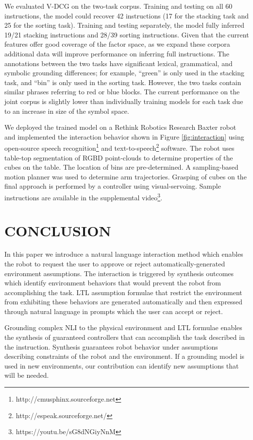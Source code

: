 \documentclass[letterpaper]{article} %
\begin{document}
We evaluated V-DCG on the two-task corpus. Training and testing on all 60 instructions, the model could recover 42 instructions (17 for the stacking task and 25 for the sorting task). Training and testing separately, the model fully inferred 19/21 stacking instructions and 28/39 sorting instructions. Given that the current features offer good coverage of the factor space, as we expand these corpora additional data will improve performance on inferring full instructions.
The annotations between the two tasks have significant lexical, grammatical, and symbolic grounding differences; for example, ``green'' is only used in the stacking task, and ``bin'' is only used in the sorting task. However, the two tasks contain similar phrases referring to red or blue blocks.
The current performance on the joint corpus is slightly lower than individually training models for each task due to an increase in size of the symbol space.

We deployed the trained model on a Rethink Robotics Research Baxter robot and implemented the interaction behavior shown in Figure \ref{fig:interaction} using open-source speech recognition\footnote{http://cmusphinx.sourceforge.net} and text-to-speech\footnote{http://espeak.sourceforge.net/} software.
The robot uses table-top segmentation of RGBD point-clouds to determine properties of the cubes on the table. The location of bins are pre-determined.
A sampling-based motion planner was used to determine arm trajectories. Grasping of cubes on the final approach is performed by a controller using visual-servoing. Sample instructions are available in the supplemental video\footnote{https://youtu.be/sG8dNGiyNnM}.

\section{CONCLUSION}

In this paper we introduce a natural language interaction method which enables the robot to request the user to approve or reject automatically-generated environment assumptions. The interaction is triggered by synthesis outcomes which identify environment behaviors that would prevent the robot from accomplishing the task. LTL assumption formulae that restrict the environment from exhibiting these behaviors are generated automatically and then expressed through natural language in prompts which the user can accept or reject.

Grounding complex NLI to the physical environment and LTL formulae enables the synthesis of guaranteed controllers that can accomplish the task described in the instruction. Synthesis guarantees robot behavior under assumptions describing constraints of the robot and the environment. If a grounding model is used in new environments, our contribution can identify new assumptions that will be needed.
\end{document}
